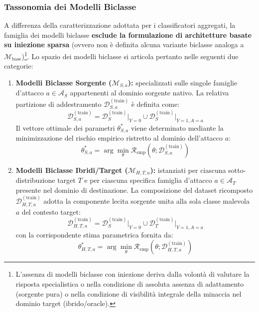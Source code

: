 \subsubsection{Tassonomia dei Modelli Biclasse}
\label{subsubsec:tassonomia_biclasse}
A differenza della caratterizzazione adottata per i classificatori aggregati, la famiglia dei modelli biclasse \textbf{esclude la formulazione di architetture basate su iniezione sparsa} (ovvero non è definita alcuna variante biclasse analoga a $\mathcal{M}_{\text{base}}$)\footnote{L'assenza di modelli biclasse con iniezione deriva dalla volontà di valutare la risposta specialistica o nella condizione di assoluta assenza di adattamento (sorgente pura) o nella condizione di visibilità integrale della minaccia nel dominio target (ibrido/oracle).}. Lo spazio dei modelli biclasse si articola pertanto nelle seguenti due categorie:
\begin{enumerate}
    \item \textbf{Modelli Biclasse Sorgente ($\mathcal{M}_{S, a}$):}
    specializzati sulle singole famiglie d'attacco $a \in \mathcal{A}_S$ appartenenti al dominio sorgente nativo. La relativa partizione di addestramento $\mathcal{D}_{S, a}^{(\text{train})}$ è definita come:
    \begin{equation}
        \mathcal{D}_{S, a}^{(\text{train})} = \mathcal{D}_{S}^{(\text{train})}\Big|_{Y=0} \cup \mathcal{D}_{S}^{(\text{train})}\Big|_{Y=1, A=a}
        \label{eq:ds_a_composition}
    \end{equation}
    Il vettore ottimale dei parametri $\theta_{S, a}^*$ viene determinato mediante la minimizzazione del rischio empirico ristretto al dominio dell'attacco $a$:
    \begin{equation}
        \theta_{S, a}^* = \arg\min_\theta \mathcal{R}_{\text{emp}}\left(\theta; \mathcal{D}_{S, a}^{(\text{train})}\right)
        \label{eq:ms_a_optimization}
    \end{equation}

    \item \textbf{Modelli Biclasse Ibridi/Target ($\mathcal{M}_{H, T, a}$):}
    istanziati per ciascuna sotto-distribuzione target $T$ e per ciascuna specifica famiglia d'attacco $a \in \mathcal{A}_T$ presente nel dominio di destinazione. La composizione del dataset ricomposto $\mathcal{D}_{H, T, a}^{(\text{train})}$ adotta la componente lecita sorgente unita alla sola classe malevola $a$ del contesto target:
    \begin{equation}
        \mathcal{D}_{H, T, a}^{(\text{train})} = \mathcal{D}_{S}^{(\text{train})}\Big|_{Y=0} \cup \mathcal{D}_{T}^{(\text{train})}\Big|_{Y=1, A=a}
        \label{eq:dh_a_composition}
    \end{equation}
    con la corrispondente stima parametrica fornita da:
    \begin{equation}
        \theta_{H, T, a}^* = \arg\min_\theta \mathcal{R}_{\text{emp}}\left(\theta; \mathcal{D}_{H, T, a}^{(\text{train})}\right)
        \label{eq:mh_a_optimization}
    \end{equation}
\end{enumerate}

